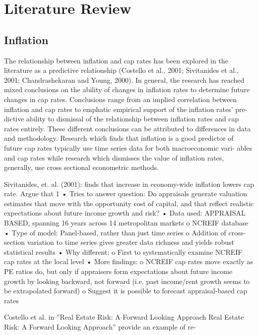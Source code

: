 \section{Literature Review}


\subsection{Inflation}

The relationship between inflation and cap rates has been explored in the literature as a predictive relationship (Costello et al., 2001; Sivitanides et al., 2001; Chandrashekaran and Young, 2000). In general, the research has reached mixed conclusions on the ability of changes in inflation rates to determine future changes in cap rates. Conclusions range from an implied correlation between inflation and cap rates to emphatic empirical support of the inflation rates’ pre- dictive ability to dismissal of the relationship between inflation rates and cap rates entirely. These different conclusions can be attributed to differences in data and methodology. Research which finds that inflation is a good predictor of future cap rates typically use time series data for both macroeconomic vari- ables and cap rates while research which dismisses the value of inflation rates, generally, use cross sectional econometric methods.

Sivitanides, et. al. (2001): finds that increase in economy-wide inflation lowers cap rate. Argue that 1%
•	Tries to answer question: Do appraisals generate valuation estimates that move with the opportunity cost of capital, and that reflect realistic expectations about future income growth and risk?
•	Data used: APPRAISAL BASED, spanning 16 years across 14 metropolitan markets
o	NCREIF database
•	Type of model: Panel-based, rather than just time series
o	Addition of cross-section variation to time series gives greater data richness and yields robust statistical results
•	Why different:
o	First to systematically examine NCREIF cap rates at the local level
•	More findings: 
o	NCREIF cap rates move exactly as PE ratios do, but only if appraisers form expectations about future income growth by looking backward, not forward (i.e. past income/rent growth seems to be extrapolated forward)
o	Suggest it is possible to forecast appraisal-based cap rates


Costello et al. in ”Real Estate Risk:  A Forward Looking Approach Real Estate Risk: A Forward Looking Approach” provide an example of re-
 




